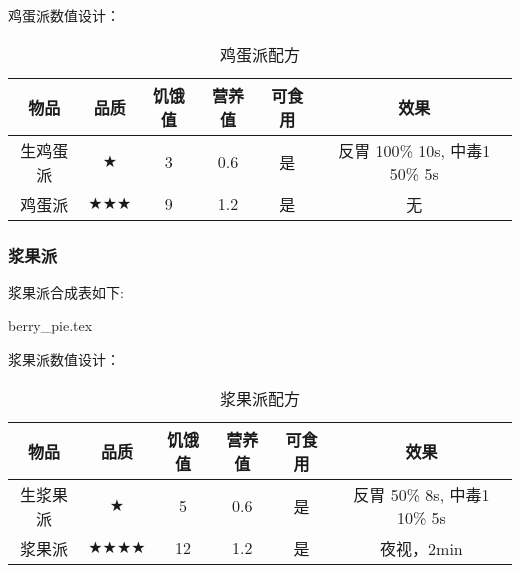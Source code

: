 鸡蛋派数值设计：

\begin{table}[H]
    \centering
    \caption{鸡蛋派配方}
    \setlength{\tabcolsep}{4mm}
    \begin{tabular}{c|ccc|cc}
        \toprule
        \textbf{物品} & \textbf{品质} & \textbf{饥饿值} & \textbf{营养值} & \textbf{可食用} & \textbf{效果}\\
        \midrule
        生鸡蛋派 & $\bigstar$ & 3 & 0.6 & 是 & 反胃 100\% 10s, 中毒1 50\% 5s \\
        鸡蛋派 & $\bigstar \bigstar \bigstar$ & 9 & 1.2 & 是 & 无 \\
        \bottomrule
    \end{tabular}
\end{table}

\subsubsection{浆果派}

浆果派合成表如下:

{berry_pie.tex}

浆果派数值设计：

\begin{table}[H]
    \centering
    \caption{浆果派配方}
    \setlength{\tabcolsep}{4mm}
    \begin{tabular}{c|ccc|cc}
        \toprule
        \textbf{物品} & \textbf{品质} & \textbf{饥饿值} & \textbf{营养值} & \textbf{可食用} & \textbf{效果}\\
        \midrule
        生浆果派 & $\bigstar$ & 5 & 0.6 & 是 & 反胃 50\% 8s, 中毒1 10\% 5s \\
        浆果派 & $\bigstar \bigstar \bigstar \bigstar$ & 12 & 1.2 & 是 & 夜视，2min \\
        \bottomrule
    \end{tabular}
\end{table}

\newpage